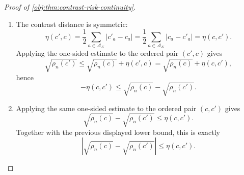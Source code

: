 \documentclass[11pt]{article}
\begin{document}
\begin{proof}[Proof of \cref{obj:thm:contrast-risk-continuity}]
\begin{enumerate}
Taking the maximum over \(z\) in the previous pointwise display gives
\[
\sqrt{\Psi_c(\mathcal D,\widehat\tau^c)}
\le
\sqrt{\Psi_{c'}(\mathcal D,\widehat\tau')}+\eta(c,c').
\]
Since \((\mathcal D,\widehat\tau^c)\) is one admissible procedure for contrast \(c\), taking the infimum over all procedures \((\mathcal D,\widehat\tau')\) for \(c'\) gives
\[
\sqrt{\rho_n(c)}\le \sqrt{\rho_n(c')}+\eta(c,c').
\]

\item The contrast distance is symmetric:
\[
\eta(c',c)
=
\frac12\sum_{a\in\mathcal A_K}|c'_a-c_a|
=
\frac12\sum_{a\in\mathcal A_K}|c_a-c'_a|
=
\eta(c,c').
\]
Applying the one-sided estimate to the ordered pair \((c',c)\) gives
\[
\sqrt{\rho_n(c')}\le \sqrt{\rho_n(c)}+\eta(c',c)
=
\sqrt{\rho_n(c)}+\eta(c,c'),
\]
hence
\[
-\eta(c,c')\le \sqrt{\rho_n(c)}-\sqrt{\rho_n(c')}.
\]

\item Applying the same one-sided estimate to the ordered pair \((c,c')\) gives
\[
\sqrt{\rho_n(c)}-\sqrt{\rho_n(c')}\le \eta(c,c').
\]
Together with the previous displayed lower bound, this is exactly
\[
\left|\sqrt{\rho_n(c)}-\sqrt{\rho_n(c')}\right|
\le
\eta(c,c').
\]
\end{enumerate}
\end{proof}
\end{document}
